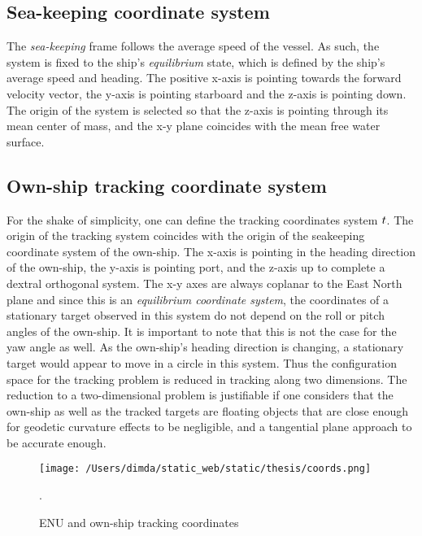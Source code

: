 \subsection{Sea-keeping coordinate system}


The \textit{sea-keeping} frame follows the average speed of the vessel. As such, the system is fixed to the ship's \textit{equilibrium} state, which is defined by the ship's average speed and heading. The positive x-axis is pointing towards the forward velocity vector, the y-axis is pointing starboard and the z-axis is pointing down. The origin of the system is selected so that the z-axis is pointing through its mean center of mass, and the x-y plane coincides with the mean free water surface.

\subsection{Own-ship tracking coordinate system}


For the shake of simplicity, one can define the tracking coordinates system $\\{t\\}$. The origin of the tracking system coincides with the origin of the seakeeping coordinate system of the own-ship. The x-axis is pointing in the heading direction of the own-ship, the y-axis is pointing port, and the z-axis up to complete a dextral orthogonal system. The x-y axes are always coplanar to the East North plane and since this is an \textit{equilibrium coordinate system}, the coordinates of a stationary target observed in this system do not depend on the roll or pitch angles of the own-ship. It is important to note that this is not the case for the yaw angle as well. As the own-ship's heading direction is changing, a stationary target would appear to move in a circle in this system. Thus the configuration space for the tracking problem is reduced in tracking along two dimensions. The reduction to a two-dimensional problem is justifiable if one considers that the own-ship as well as the tracked targets are floating objects that are close enough for geodetic curvature effects to be negligible, and a tangential plane approach to be accurate enough.




\begin{figure}[H] 	
	\centering
	\texttt{[image: /Users/dimda/static\_web/static/thesis/coords.png]}
	\caption{ENU and own-ship tracking coordinates}.
	\label{fig:tracking_coords}	
\end{figure}


